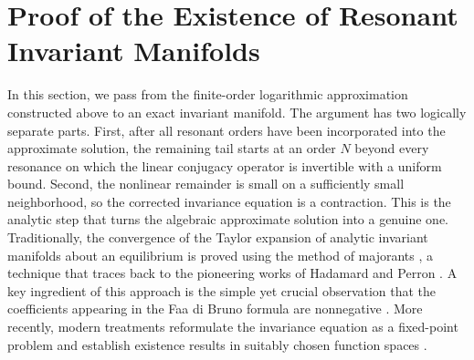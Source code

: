 \documentclass{amsart}
\theoremstyle{plain}
\newtheorem{proposition}[theorem]{Proposition}
\theoremstyle{definition}
\newtheorem{remark}[theorem]{Remark}
\begin{document}
















\section{Proof of the Existence of Resonant Invariant Manifolds}\label{existence}

In this section, we pass from the finite-order logarithmic approximation constructed above to an exact invariant manifold. The argument has two logically separate parts. First, after all resonant orders have been incorporated into the approximate solution, the remaining tail starts at an order $N$ beyond every resonance on which the linear conjugacy operator is invertible with a uniform bound. Second, the nonlinear remainder is small on a sufficiently small neighborhood, so the corrected invariance equation is a contraction. This is the analytic step that turns the algebraic approximate solution into a genuine one. \\
Traditionally, the convergence of the Taylor expansion of analytic invariant manifolds about an equilibrium is proved using the method of majorants \cite{moser1956analytic,moser2016stable}, a technique that traces back to the pioneering works of Hadamard \cite{hadamard1901} and Perron \cite{perron1929stabilitat}. A key ingredient of this approach is the simple yet crucial observation that the coefficients appearing in the Faa di Bruno formula are nonnegative \cite{comtet2012advanced,siegel2012lectures}. More recently, modern treatments reformulate the invariance equation as a fixed-point problem and establish existence results in suitably chosen function spaces \cite{figueras2017framework,hirsch1970invariant}.\\
\end{document}
